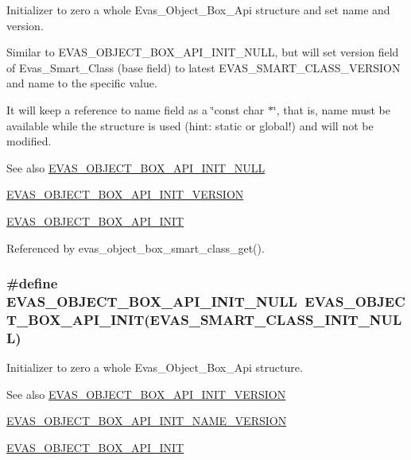 Initializer to zero a whole Evas\_\-Object\_\-Box\_\-Api structure and set name and version. 

Similar to EVAS\_\-OBJECT\_\-BOX\_\-API\_\-INIT\_\-NULL, but will set version field of Evas\_\-Smart\_\-Class (base field) to latest EVAS\_\-SMART\_\-CLASS\_\-VERSION and name to the specific value.

It will keep a reference to name field as a \char`\"{}const char $\ast$\char`\"{}, that is, name must be available while the structure is used (hint: static or global!) and will not be modified.

\begin{DoxySeeAlso}{See also}
\hyperlink{group__Evas__Object__Box_gacfe469ef2fc811ab4af8c77105bf4baa}{EVAS\_\-OBJECT\_\-BOX\_\-API\_\-INIT\_\-NULL} 

\hyperlink{group__Evas__Object__Box_gabab7b773ecb31ecbf661646d5db1bea1}{EVAS\_\-OBJECT\_\-BOX\_\-API\_\-INIT\_\-VERSION} 

\hyperlink{group__Evas__Object__Box_ga118b1b5bc278185207e7651911637ac8}{EVAS\_\-OBJECT\_\-BOX\_\-API\_\-INIT} 
\end{DoxySeeAlso}


Referenced by evas\_\-object\_\-box\_\-smart\_\-class\_\-get().

\subsubsection[{EVAS\_\-OBJECT\_\-BOX\_\-API\_\-INIT\_\-NULL}]{\setlength{\rightskip}{0pt plus 5cm}\#define EVAS\_\-OBJECT\_\-BOX\_\-API\_\-INIT\_\-NULL~EVAS\_\-OBJECT\_\-BOX\_\-API\_\-INIT(EVAS\_\-SMART\_\-CLASS\_\-INIT\_\-NULL)}\label{group__Evas__Object__Box_gacfe469ef2fc811ab4af8c77105bf4baa}


Initializer to zero a whole Evas\_\-Object\_\-Box\_\-Api structure. 

\begin{DoxySeeAlso}{See also}
\hyperlink{group__Evas__Object__Box_gabab7b773ecb31ecbf661646d5db1bea1}{EVAS\_\-OBJECT\_\-BOX\_\-API\_\-INIT\_\-VERSION} 

\hyperlink{group__Evas__Object__Box_gad35b8c6b395f976397abbb6f964878e7}{EVAS\_\-OBJECT\_\-BOX\_\-API\_\-INIT\_\-NAME\_\-VERSION} 

\hyperlink{group__Evas__Object__Box_ga118b1b5bc278185207e7651911637ac8}{EVAS\_\-OBJECT\_\-BOX\_\-API\_\-INIT} 
\end{DoxySeeAlso}
